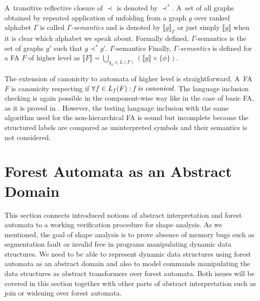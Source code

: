 \documentclass[a4paper, 12pt]{article}
\begin{document}
A~transitive reflective closure of $\prec$ is denoted by $\prec^*$.
A~set of all graphs obtained by repeated application of unfolding from
a graph $g$ over ranked alphabet $\Gamma$ is called \emph{$\Gamma$-semantics}
and is denoted by $\llbracket g \rrbracket_\Gamma$ or just simply $\llbracket g \rrbracket$ when it is
clear which alphabet we speak about.
Formally defined, $\Gamma$-semantics is the set of graphs $g'$ such that $g \prec^* g'$.
$\Gamma$-semantics  Finally, \emph{$\Gamma$-semantics} is defined for a FA $F$ of higher level as
$\llbracket F \rrbracket = \bigcup_{g_\phi \in L(F)} (\llbracket g \rrbracket \times \{\phi\})$.

The extension of canonicity to automata of higher level is straightforward.
A~FA $F$ is canonicity respecting if $\forall f \in L_f(F): \emph{f is canonical}$.
The language inclusion checking is again possible in the component-wise way like in the case of basic FA,
as it is proved in \cite{forester:techrep}.
However, the testing language inclusion with the same algorithm used for the non-hierarchical FA
is sound but incomplete because the structured labels are compared as uninterpreted symbols and their semantics
is not considered.

\section{Forest Automata as an Abstract Domain}
\label{sec:analysis}

This section connects introduced notions of abstract interpretation
and forest automata to a working verification procedure for shape analysis.
As we mentioned, the goal of shape analysis is to prove
absence of memory bugs such as segmentation fault or invalid free
in programs manipulating dynamic data structures.
We need to be able to represent dynamic data structures
using forest automata as an abstract domain and
also to model commands manipulating the data structures
as abstract transformers over forest automata.
Both issues will be covered in this section together with
other parts of abstract interpretation such as join or widening
over forest automata.
\end{document}
